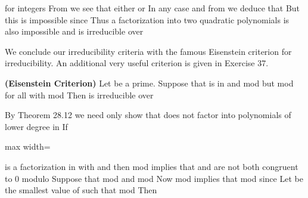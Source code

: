 \documentclass[11pt,oneside]{article}
\begin{document}
\begin{BookBody}
\noindent for integers  From  we see that either  or  In any case and from  we deduce that  But this is impossible since  Thus a factorization into two quadratic polynomials is also impossible and  is irreducible over \BookEnd{\blacktriangle}

We conclude our irreducibility criteria with the famous Eisenstein criterion for irreducibility. An additional very useful criterion is given in Exercise 37.

 \textbf{(Eisenstein Criterion)} Let  be a prime. Suppose that  is in  and mod  but mod  for all  with mod  Then  is irreducible over 

 By Theorem 28.12 we need only show that  does not factor into polynomials of lower degree in  If

\begin{center}\begin{adjustbox}{max width=\linewidth}\end{adjustbox}\end{center}

\noindent is a factorization in  with  and  then mod  implies that  and  are not both congruent to 0 modulo  Suppose that mod  and mod  Now mod  implies that mod  since  Let  be the smallest value of  such that mod  Then


\end{BookBody}
\end{document}
